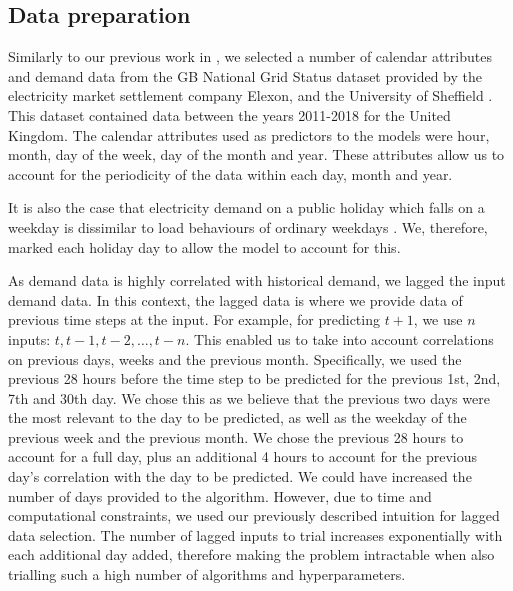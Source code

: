
\subsection{Data preparation}

Similarly to our previous work in \cite{Kell2018a}, we selected a number of calendar attributes and demand data from the GB National Grid Status dataset provided by the electricity market settlement company Elexon, and the University of Sheffield \cite{gbnationalgridstatus_2019}. This dataset contained data between the years 2011-2018 for the United Kingdom. The calendar attributes used as predictors to the models were hour, month, day of the week, day of the month and year. These attributes allow us to account for the periodicity of the data within each day, month and year.

It is also the case that electricity demand on a public holiday which falls on a weekday is dissimilar to load behaviours of ordinary weekdays \cite{Kim2000}. We, therefore, marked each holiday day to allow the model to account for this.

As demand data is highly correlated with historical demand, we lagged the input demand data. In this context, the lagged data is where we provide data of previous time steps at the input. For example, for predicting $t+1$, we use $n$ inputs: $t,t-1,t-2,\ldots,t-n$. This enabled us to take into account correlations on previous days, weeks and the previous month. Specifically, we used the previous 28 hours before the time step to be predicted for the previous 1st, 2nd, 7th and 30th day. We chose this as we believe that the previous two days were the most relevant to the day to be predicted, as well as the weekday of the previous week and the previous month. We chose the previous 28 hours to account for a full day, plus an additional 4 hours to account for the previous day's correlation with the day to be predicted. We could have increased the number of days provided to the algorithm. However, due to time and computational constraints, we used our previously described intuition for lagged data selection. The number of lagged inputs to trial increases exponentially with each additional day added, therefore making the problem intractable when also trialling such a high number of algorithms and hyperparameters. 

